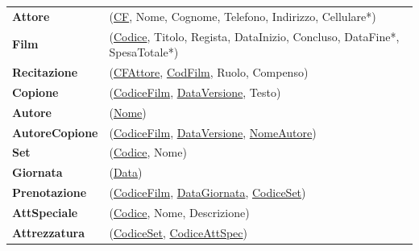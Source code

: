 \documentclass{article}
\begin{document}
\begin{tabular}{ll}
	\textbf{Attore} & (\underline{CF}, Nome, Cognome, Telefono, Indirizzo, Cellulare*) \\
	
	\textbf{Film} & (\underline{Codice}, Titolo, Regista, DataInizio, Concluso, DataFine*, SpesaTotale*) \\
	
	\textbf{Recitazione} & (\underline{CFAttore}, \underline{CodFilm}, Ruolo, Compenso) \\
	
	\textbf{Copione} & (\underline{CodiceFilm}, \underline{DataVersione}, Testo) \\
	
	\textbf{Autore} & (\underline{Nome}) \\
	
	\textbf{AutoreCopione} & (\underline{CodiceFilm}, \underline{DataVersione}, \underline{NomeAutore}) \\
	
	\textbf{Set} & (\underline{Codice}, Nome) \\
	
	\textbf{Giornata} & (\underline{Data}) \\
	
	\textbf{Prenotazione} & (\underline{CodiceFilm}, \underline{DataGiornata}, \underline{CodiceSet}) \\
	
	\textbf{AttSpeciale} & (\underline{Codice}, Nome, Descrizione) \\
	
	\textbf{Attrezzatura} & (\underline{CodiceSet}, \underline{CodiceAttSpec}) \\
\end{tabular}
\end{document}
